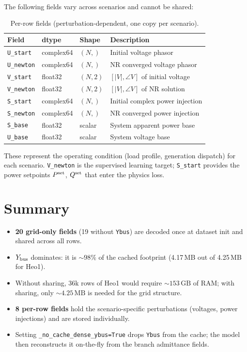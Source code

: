 \documentclass{article}
\begin{document}
The following fields vary across scenarios and cannot be shared:

\begin{table}[h]
\centering
\caption{Per-row fields (perturbation-dependent, one copy per scenario).}
\label{tab:perrow}
\begin{tabular}{llll}
\toprule
Field & dtype & Shape & Description \\
\midrule
\texttt{U\_start}  & complex64 & $(N,)$    & Initial voltage phasor \\
\texttt{U\_newton} & complex64 & $(N,)$    & NR converged voltage phasor \\
\texttt{V\_start}  & float32   & $(N, 2)$  & $[|V|, \angle V]$ of initial voltage \\
\texttt{V\_newton} & float32   & $(N, 2)$  & $[|V|, \angle V]$ of NR solution \\
\texttt{S\_start}  & complex64 & $(N,)$    & Initial complex power injection \\
\texttt{S\_newton} & complex64 & $(N,)$    & NR converged power injection \\
\texttt{S\_base}   & float32   & scalar    & System apparent power base \\
\texttt{U\_base}   & float32   & scalar    & System voltage base \\
\bottomrule
\end{tabular}
\end{table}

These represent the operating condition (load profile, generation dispatch)
for each scenario.  \texttt{V\_newton} is the supervised learning target;
\texttt{S\_start} provides the power setpoints $P^{\rm set}$, $Q^{\rm set}$
that enter the physics loss.

\section{Summary}

\begin{itemize}[noitemsep]
  \item \textbf{20 grid-only fields} (19 without \texttt{Ybus}) are decoded
    once at dataset init and shared across all rows.
  \item $Y_{\rm bus}$ dominates: it is $\sim\!98\%$ of the cached footprint
    (4.17\,MB out of 4.25\,MB for Heo1).
  \item Without sharing, 36k rows of Heo1 would require $\sim\!153\,\mathrm{GB}$
    of RAM; with sharing, only $\sim\!4.25\,\mathrm{MB}$ is needed for the
    grid structure.
  \item \textbf{8 per-row fields} hold the scenario-specific perturbations
    (voltages, power injections) and are stored individually.
  \item Setting \texttt{\_no\_cache\_dense\_ybus=True} drops \texttt{Ybus}
    from the cache; the model then reconstructs it on-the-fly from the
    branch admittance fields.
\end{itemize}
\end{document}
